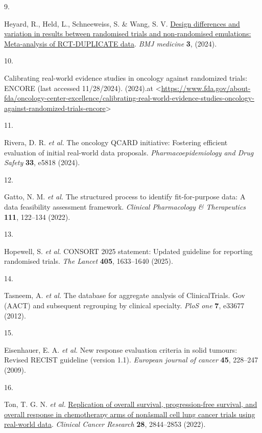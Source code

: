\documentclass[
  letterpaper,
  DIV=11,
  numbers=noendperiod]{scrartcl}
\newlength{\cslhangindent}
\newlength{\csllabelwidth}
\newenvironment{CSLReferences}[2] %
 {\begin{list}{}{%
  \setlength{\itemindent}{0pt}
  \setlength{\leftmargin}{0pt}
  \setlength{\parsep}{0pt}
  \ifodd #1
   \setlength{\leftmargin}{\cslhangindent}
   \setlength{\itemindent}{-1\cslhangindent}
  \fi
  \setlength{\itemsep}{#2\baselineskip}}}
 {\end{list}}
\newcommand{\CSLLeftMargin}[1]{\parbox[t]{\csllabelwidth}{\strut#1\strut}}
\newcommand{\CSLRightInline}[1]{\parbox[t]{\linewidth - \csllabelwidth}{\strut#1\strut}}
\begin{document}
\begin{CSLReferences}{0}{0}
\CSLLeftMargin{9. }%
\CSLRightInline{Heyard, R., Held, L., Schneeweiss, S. \& Wang, S. V.
\href{https://doi.org/10.1136/bmjmed-2023-000709}{Design differences and
variation in results between randomised trials and non-randomised
emulations: Meta-analysis of RCT-DUPLICATE data}. \emph{BMJ medicine}
\textbf{3}, (2024).}

\CSLLeftMargin{10. }%
\CSLRightInline{Calibrating real-world evidence studies in oncology
against randomized trials: ENCORE (last accessed 11/28/2024). (2024).at
\textless{}\url{https://www.fda.gov/about-fda/oncology-center-excellence/calibrating-real-world-evidence-studies-oncology-against-randomized-trials-encore}\textgreater{}}

\CSLLeftMargin{11. }%
\CSLRightInline{Rivera, D. R. \emph{et al.} The oncology QCARD
initiative: Fostering efficient evaluation of initial real-world data
proposals. \emph{Pharmacoepidemiology and Drug Safety} \textbf{33},
e5818 (2024).}

\CSLLeftMargin{12. }%
\CSLRightInline{Gatto, N. M. \emph{et al.} The structured process to
identify fit-for-purpose data: A data feasibility assessment framework.
\emph{Clinical Pharmacology \& Therapeutics} \textbf{111}, 122--134
(2022).}

\CSLLeftMargin{13. }%
\CSLRightInline{Hopewell, S. \emph{et al.} CONSORT 2025 statement:
Updated guideline for reporting randomised trials. \emph{The Lancet}
\textbf{405}, 1633--1640 (2025).}

\CSLLeftMargin{14. }%
\CSLRightInline{Tasneem, A. \emph{et al.} The database for aggregate
analysis of ClinicalTrials. Gov (AACT) and subsequent regrouping by
clinical specialty. \emph{PloS one} \textbf{7}, e33677 (2012).}

\CSLLeftMargin{15. }%
\CSLRightInline{Eisenhauer, E. A. \emph{et al.} New response evaluation
criteria in solid tumours: Revised RECIST guideline (version 1.1).
\emph{European journal of cancer} \textbf{45}, 228--247 (2009).}

\CSLLeftMargin{16. }%
\CSLRightInline{Ton, T. G. N. \emph{et al.}
\href{https://doi.org/10.1158/1078-0432.CCR-22-0471}{Replication of
overall survival, progression-free survival, and overall response in
chemotherapy arms of nonâsmall cell lung cancer trials using real-world
data}. \emph{Clinical Cancer Research} \textbf{28}, 2844--2853 (2022).}


\end{CSLReferences}
\end{document}
